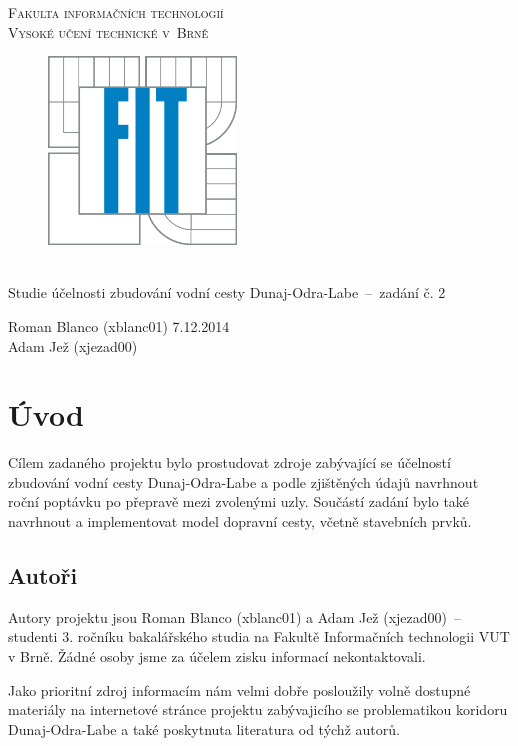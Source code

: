 \documentclass[11pt,a4paper]{article}
\begin{document}
  \begin{titlepage}
    \begin{center}
      \Huge
      \textsc{Fakulta informačních technologií \\ Vysoké učení technické v~Brně}
      \vspace{100px}
      \begin{figure}[!h]
        \centering
        \includegraphics[height=5cm]{logo}
      \end{figure}
      \\[50mm]
      \LARGE{Studie účelnosti zbudování vodní cesty Dunaj-Odra-Labe \,--\, 
             zadání č. 2}
      \vfill
    \end{center}
    \Large{Roman Blanco (xblanc01) \hfill 7.12.2014 \\
           Adam Jež (xjezad00)}

  \end{titlepage}

  \section{Úvod}

    Cílem zadaného projektu bylo prostudovat zdroje zabývající se účelností
    zbudování vodní cesty Dunaj-Odra-Labe a podle zjištěných údajů navrhnout
    roční poptávku po přepravě mezi zvolenými uzly. Součástí zadání bylo také
    navrhnout a implementovat model dopravní cesty, včetně stavebních prvků.

    \subsection{Autoři}

      Autory projektu jsou Roman Blanco (xblanc01) a Adam Jež (xjezad00) \,--\, studenti 3. ročníku bakalářského studia na Fakultě
      Informačních technologii VUT v Brně. Žádné osoby jsme za účelem zisku
      informací nekontaktovali.
      
      Jako prioritní zdroj informacím nám velmi dobře posloužily volně dostupné materiály na internetové stránce projektu
      zabývajicího se problematikou koridoru Dunaj-Odra-Labe a také poskytnuta literatura od týchž autorů.
\end{document}
